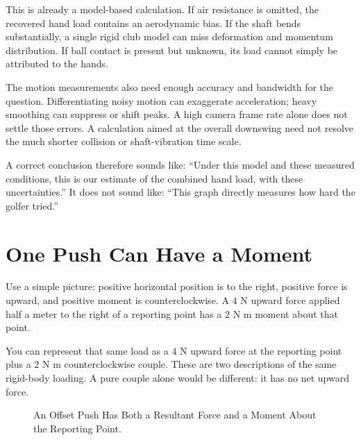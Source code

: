 \documentclass[11pt,a4paper]{article}
\begin{document}
This is already a model-based calculation. If air resistance is omitted, the recovered hand load contains an aerodynamic bias. If the shaft bends substantially, a single rigid club model can miss deformation and momentum distribution. If ball contact is present but unknown, its load cannot simply be attributed to the hands.

The motion measurements also need enough accuracy and bandwidth for the question. Differentiating noisy motion can exaggerate acceleration; heavy smoothing can suppress or shift peaks. A high camera frame rate alone does not settle those errors. A calculation aimed at the overall downswing need not resolve the much shorter collision or shaft-vibration time scale.

A correct conclusion therefore sounds like: ``Under this model and these measured conditions, this is our estimate of the combined hand load, with these uncertainties.'' It does not sound like: ``This graph directly measures how hard the golfer tried.''

\section{One Push Can Have a Moment}
Use a simple picture: positive horizontal position is to the right, positive force is upward, and positive moment is counterclockwise. A $4$ N upward force applied half a meter to the right of a reporting point has a $2$ N m moment about that point.

You can represent that same load as a $4$ N upward force at the reporting point plus a $2$ N m counterclockwise couple. These are two descriptions of the same rigid-body loading. A pure couple alone would be different: it has no net upward force.

\begin{figure}[htbp]\centering
{}
\caption{An Offset Push Has Both a Resultant Force and a Moment About the Reporting Point.}
\end{figure}
\end{document}
